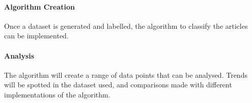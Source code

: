 \paragraph{Algorithm Creation}
Once a dataset is generated and labelled, the algorithm to classify the articles can be implemented. 

\paragraph{Analysis}
The algorithm will create a range of data points that can be analysed. Trends will be spotted in the dataset used, and comparisons made with different implementations of the algorithm.
